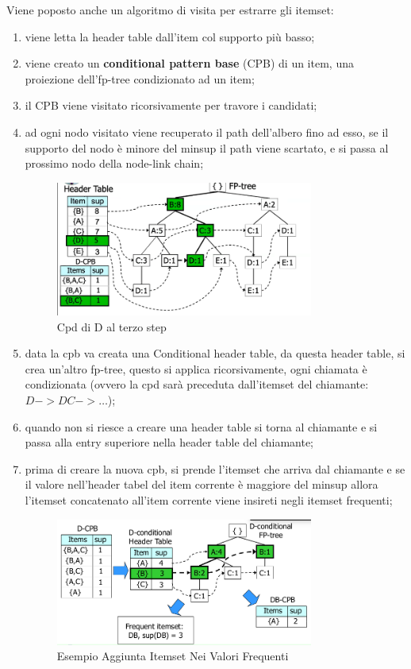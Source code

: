 \documentclass[12pt]{article}
\begin{document}
Viene poposto anche un algoritmo di visita per estrarre gli itemset:
\begin{enumerate}
    \item viene letta la header table dall'item col supporto pi\`u basso;
    \item viene creato un \textbf{conditional pattern base} (CPB) di un item, una proiezione dell'fp-tree condizionato ad un item;
    \item il CPB viene visitato ricorsivamente per travore i candidati;
    \item ad ogni nodo visitato viene recuperato il path dell'albero fino ad esso, se il supporto del nodo \`e minore del minsup il path viene scartato, e si passa al prossimo nodo della node-link chain;
        \begin{figure}[H]
            \centering
            \includegraphics[width=0.8\textwidth]{cpd-di-d.png}
            \caption{Cpd di D al terzo step}
            \label{fig:cpd-di-d}
        \end{figure}
    \item data la cpb va creata una Conditional header table, da questa header table, si crea un'altro fp-tree, questo si applica ricorsivamente, ogni chiamata \`e condizionata (ovvero la cpd sar\`a preceduta dall'itemset del chiamante: $ D -> DC -> \dots$);
    \item quando non si riesce a creare una header table si torna al chiamante e si passa alla entry superiore nella header table del chiamante;
    \item prima di creare la nuova cpb, si prende l'itemset che arriva dal chiamante e se il valore nell'header tabel del item corrente \`e maggiore del minsup allora l'itemset concatenato all'item corrente viene insireti negli itemset frequenti;
        \begin{figure}[H]
            \centering
            \includegraphics[width=0.8\textwidth]{esempio-aggiunta-itemset-nei-valori-frequenti.png}
            \caption{Esempio Aggiunta Itemset Nei Valori Frequenti}
            \label{fig:esempio-aggiunta-itemset-nei-valori-frequenti}
        \end{figure}
\end{enumerate}
\end{document}
